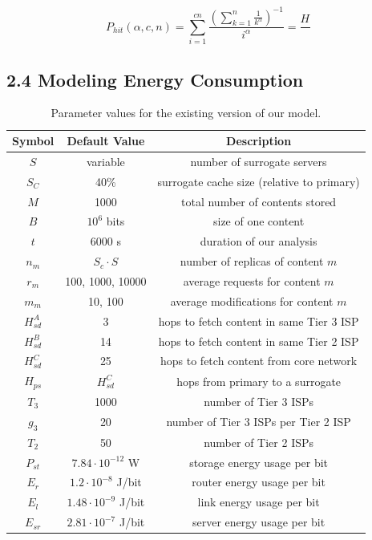 \documentclass[
	a4paper, %
	10pt, %
	unnumberedsections, %
	twoside, %
]{LTJournalArticle}
\begin{document}
\[ P_{hit}(\alpha, c, n) = \sum_{i=1}^{cn} \frac{\left( \sum_{k=1}^{n} \frac{1}{k^\alpha}\right)^{-1}}{i^\alpha} = \frac{H_{}}{} \]

\subsection{2.4  Modeling Energy Consumption}
\begin{center}
\begin{table}[h]
\scriptsize
\begin{tabular}{ |c|c|c| } 
 \hline
 Symbol & Default Value & Description \\ 
 \hline
 $S$ & variable & number of surrogate servers \\ 
 \hline
 $S_C$ & 40\% & surrogate cache size (relative to primary) \\ 
 \hline
 $M$ & 1000 & total number of contents stored \\ 
 \hline
 $B$ & $10^6$ bits & size of one content \\ 
 \hline
 $t$ & 6000 s & duration of our analysis \\ 
 \hline
 $n_m$ & $S_c \cdot S$ & number of replicas of content $m$ \\ 
 \hline
 $r_m$ & 100, 1000, 10000 & average requests for content $m$ \\ 
 \hline
 $m_m$ & 10, 100 & average modifications for content $m$ \\ 
 \hline
 $H^A_{sd}$ & 3 & hops to fetch content in same Tier 3 ISP \\ 
 \hline
 $H^B_{sd}$ & 14 & hops to fetch content in same Tier 2 ISP \\ 
 \hline
 $H^C_{sd}$ & 25 & hops to fetch content from core network \\ 
 \hline
 $H_{ps}$ & $H^C_{sd}$ & hops from primary to a surrogate \\ 
 \hline
 $T_3$ & 1000 & number of Tier 3 ISPs \\ 
 \hline
 $g_3$ & 20 & number of Tier 3 ISPs per Tier 2 ISP \\ 
 \hline
 $T_2$ & 50 & number of Tier 2 ISPs \\ 
 \hline
 $P_{st}$ & $7.84 \cdot 10^{-12}$ W & storage energy usage per bit \\ 
 \hline
 $E_r$ & $1.2 \cdot 10^{-8}$ J/bit & router energy usage per bit \\ 
 \hline
 $E_l$ & $1.48 \cdot 10^{-9}$ J/bit & link energy usage per bit \\ 
 \hline
 $E_{sr}$ & $2.81 \cdot 10^{-7}$ J/bit & server energy usage per bit \\ 
 \hline
\end{tabular}
\caption{Parameter values for the existing version of our model.}
\end{table}
\end{center}
\end{document}
